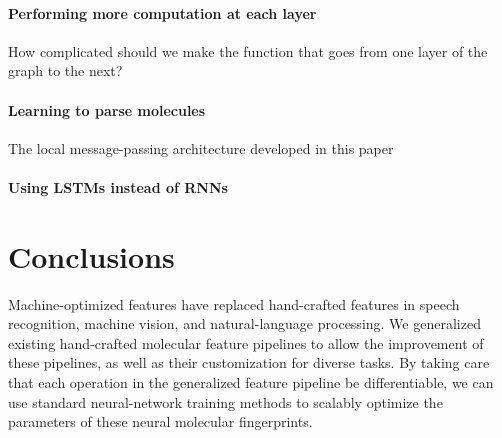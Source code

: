 \documentclass{article}
\begin{document}
\paragraph{Performing more computation at each layer}
How complicated should we make the function that goes from one layer of the graph to the next?

\paragraph{Learning to parse molecules}
The local message-passing architecture developed in this paper




\paragraph{Using LSTMs instead of RNNs}


\section{Conclusions}
Machine-optimized features have replaced hand-crafted features in speech recognition, machine vision, and natural-language processing.
We generalized existing hand-crafted molecular feature pipelines to allow the improvement of these pipelines, as well as their customization for diverse tasks.
By taking care that each operation in the generalized feature pipeline be differentiable, we can use standard neural-network training methods to scalably optimize the parameters of these neural molecular fingerprints.



\end{document}
